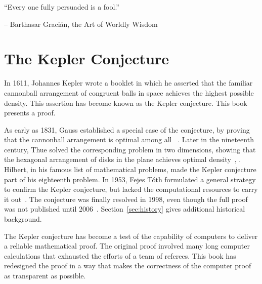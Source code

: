 {

\narrower\parindent=0pt
\baselineskip

{\it

``Every one fully persuaded is a fool.''

{\hfill\rm-- Barthasar Graci\'an, the Art of Worldly Wisdom~\cite{Gracian}} %

}

{

\it



}

}



\newpage

\section*{The Kepler Conjecture}

In 1611, Johannes Kepler wrote a booklet in which he asserted that the familiar
cannonball arrangement of congruent balls in space achieves the
highest possible density.  This assertion has become known as the
Kepler conjecture.  This book presents a proof.

As early as 1831, Gauss established a special case of the conjecture,
by proving that the cannonball arrangement is optimal among all
~\cite{Gau31}.  Later in the nineteenth century,
Thue solved the corresponding problem in two dimensions, showing that
the hexagonal arrangement of disks in the plane achieves optimal
density~\cite{Thu92}, \cite{Thu10}.  Hilbert, in his famous list of
mathematical problems, made the Kepler conjecture part of his eighteenth
problem.  In 1953, Fejes T\'oth formulated a general strategy to
confirm the Kepler conjecture, but lacked the computational resources
to carry it out~\cite{Fej53}.  The conjecture was finally resolved in
1998, even though the full proof was not published until
2006~\cite{Hales:2006:DCG}.  Section~\ref{sec:history} gives
additional historical background.

The Kepler conjecture has become a test of the capability of computers to
deliver a reliable mathematical proof.  The original proof 
involved many long computer calculations that
exhausted the efforts of a team of referees.  This book has
 redesigned the proof in a way that makes the correctness of
the computer proof as transparent as possible.


